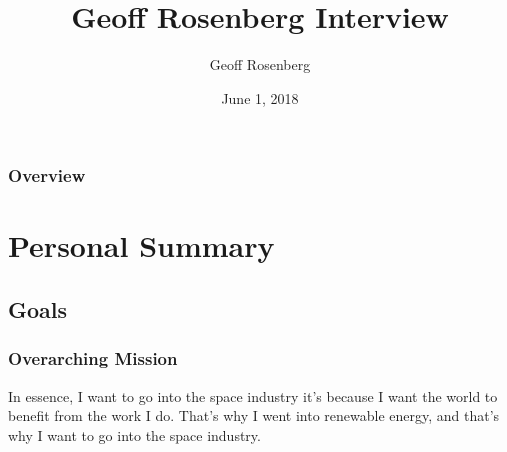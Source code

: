 \documentclass[aspectratio=169]{beamer}
\title[Summary Presentation]{Geoff Rosenberg Interview} %
\author{Geoff Rosenberg} %
\institute[] %
{
\textit{Geoff.Rosenberg@gmail.com} %
}
\date{June 1, 2018} %
\begin{document}
\begin{frame}
\titlepage %
\end{frame}

\begin{frame}
\frametitle{Overview} %
\tableofcontents %
\end{frame}


\section{Personal Summary} %


\subsection{Goals}
\begin{frame}
  \frametitle{Overarching Mission}
  In essence, I want to go into the space industry it's because I want the world to benefit from the work I do.  That's why I went into renewable energy, and that's why I want to go into the space industry.
\end{frame}
\end{document}
